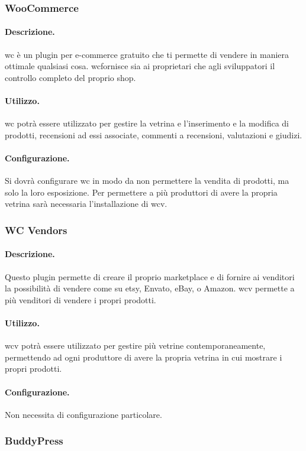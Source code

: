\subsubsection{WooCommerce}
\paragraph{Descrizione.} \gls{wc} è un plugin per e-commerce gratuito che ti permette di vendere in maniera ottimale qualsiasi cosa. \gls{wc}fornisce sia ai proprietari che agli sviluppatori il controllo completo del proprio shop.
\paragraph{Utilizzo.} \gls{wc} potrà essere utilizzato per gestire la vetrina e l'inserimento e la modifica di prodotti, recensioni ad essi associate, commenti a recensioni, valutazioni e giudizi.
\paragraph{Configurazione.} Si dovrà configurare \gls{wc} in modo da non permettere la vendita di prodotti, ma solo la loro esposizione.
Per permettere a più produttori di avere la propria vetrina sarà necessaria l'installazione di \gls{wcv}.

\subsubsection{WC Vendors}
\paragraph{Descrizione.} Questo plugin permette di creare il proprio marketplace e di fornire ai venditori la possibilità di vendere come su etsy, Envato, eBay, o Amazon. \gls{wcv} permette a più venditori di vendere i propri prodotti.
\paragraph{Utilizzo.} \gls{wcv} potrà essere utilizzato per gestire più vetrine contemporaneamente, permettendo ad ogni produttore di avere la propria vetrina in cui mostrare i propri prodotti.
\paragraph{Configurazione.} Non necessita di configurazione particolare.

\subsubsection{BuddyPress}
